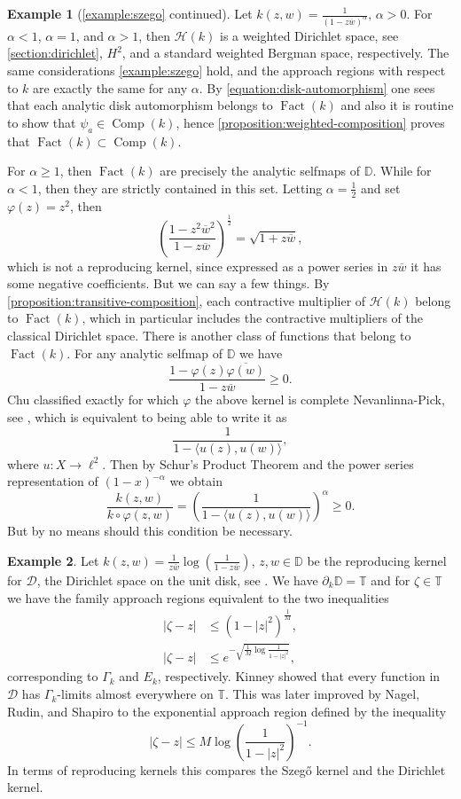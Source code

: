 \documentclass[leqno, final]{article}
\theoremstyle{definition}
\newtheorem{example}{Example}
\newcommand{\disk}{\mathbb{D}}
\newcommand{\dirichlet}{\mathcal{D}}
\newcommand{\torus}{\mathbb{T}}
\newcommand{\Hilbert}{\mathcal{H}}
\newcommand{\rand}{\partial}
\renewcommand{\phi}{\varphi}
\newcommand{\la}{\langle}
\newcommand{\ra}{\rangle}
\DeclareMathOperator{\Fact}{Fact}
\DeclareMathOperator{\Comp}{Comp}
\begin{document}
\begin{example}[\cref{example:szego} continued]\label{example:szego-power}
Let $k(z,w) = \frac1{(1-z\overline w)^\alpha},\,\alpha>0$. For $\alpha<1$, $\alpha=1$, and
$\alpha>1$, then $\Hilbert(k)$ is a weighted Dirichlet space, see \cref{section:dirichlet},
$H^2$, and a standard weighted Bergman space, respectively.
The same considerations \cref{example:szego} hold, and the approach regions with respect
to $k$ are exactly the same for any $\alpha$. By \eqref{equation:disk-automorphism} one
sees that each analytic disk automorphism belongs to $\Fact(k)$ and also it is routine
to show that $\psi_a\in\Comp(k)$, hence \cref{proposition:weighted-composition} proves
that $\Fact(k)\subset\Comp(k)$.

For $\alpha\geq1$, then $\Fact(k)$ are precisely the analytic selfmaps of $\disk$.
While for $\alpha<1$, then they are strictly contained in this set. Letting $\alpha=\frac12$
and set $\phi(z)=z^2$, then \[
	\left(\frac{1-z^2\overline w^2}{1-z\overline w}\right)^\frac12
	= \sqrt{1+z\overline w},
\]
which is not a reproducing kernel, since expressed as a power series in $z\overline w$ it
has some negative coefficients. But we can say a few things. By \cref{proposition:transitive-composition},
each contractive multiplier of $\Hilbert(k)$ belong to $\Fact(k)$, which in particular
includes the contractive multipliers of the classical Dirichlet space. There is another
class of functions that belong to $\Fact(k)$. For any analytic selfmap of $\disk$ we
have \[
	\frac{1-\phi(z)\overline{\phi(w)}}{1-z\overline w} \geq 0.
\]
Chu \cite{chu_pick} classified exactly for which $\phi$ the above kernel
is complete Nevanlinna-Pick, see \cite{agler-mccarthy_cnp}, which is equivalent
to being able to write it as \[
	\frac1{1-\la u(z),u(w)\ra},
\]
where $u:X\to\ell^2$. Then by Schur's Product Theorem and the power series representation
of $(1-x)^{-\alpha}$ we obtain \[
	\frac{k(z,w)}{k\circ\phi(z,w)}
	= \left(\frac1{1-\la u(z),u(w)\ra}\right)^\alpha
	\geq 0.
\]
But by no means should this condition be necessary.
\end{example}

\begin{example}
Let $k(z,w) = \frac1{z\overline w}\log(\frac1{1-z\overline w}),\,z,w\in\disk$ be the reproducing
kernel for $\dirichlet$, the Dirichlet space on the unit disk, see
\cite{ross_dirichlet}. We have $\rand_k\disk=\torus$ and for $\zeta\in\torus$
we have the family approach regions equivalent to the two inequalities
\begin{align*}
	|\zeta - z| &\leq (1-|z|^2)^\frac1M, \\
	|\zeta - z| &\leq e^{-\sqrt{\frac1M\log{\frac1{1-|z|^2}}}},
\end{align*}
corresponding to $\Gamma_k$ and $E_k$, respectively. Kinney \cite{kinney_dirichlet}
showed that every function in $\dirichlet$ has $\Gamma_k$-limits almost
everywhere on $\torus$. This was later improved by
Nagel, Rudin, and Shapiro \cite{nagel_dirichlet} to the exponential approach
region defined by the inequality \[
	|\zeta - z| \leq M\log\left(\frac1{1-|z|^2}\right)^{-1}.
\]
In terms of reproducing kernels this compares the Szegő kernel and the Dirichlet kernel.
\end{example}
\end{document}
